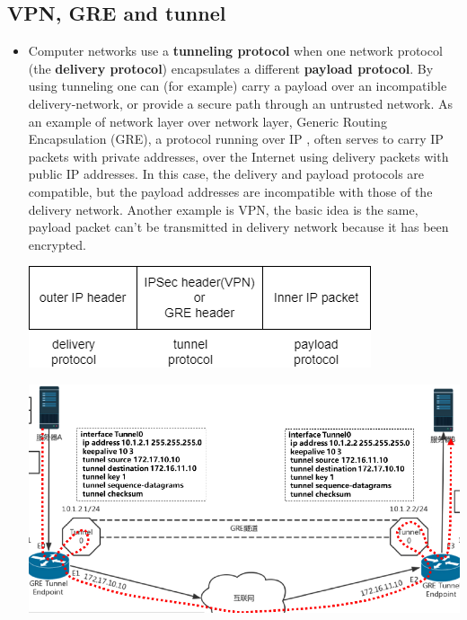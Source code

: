 \documentclass[a4paper,11pt,twoside]{book}
\begin{document}
\subsection{VPN, GRE and tunnel}
\begin{itemize}
	
	
	

	\item Computer networks use a \textbf{tunneling protocol} when one network protocol (the \textbf{delivery protocol}) encapsulates a different \textbf{payload protocol}. By using tunneling one can (for example) carry a payload over an incompatible delivery-network, or provide a secure path through an untrusted network. As an example of network layer over network layer, Generic Routing Encapsulation (GRE), a protocol running over IP , often serves to carry IP packets with private addresses, over the Internet using delivery packets with public IP addresses. In this case, the delivery and payload protocols are compatible, but the payload addresses are incompatible with those of the delivery network. Another example is VPN, the basic idea is the same, payload packet can't be transmitted in delivery network because it has been encrypted. 
	
	
	
	\begin{center}
		\includegraphics[width=0.48\linewidth]{pics/payload.drawio.png}
	\end{center}
	
	

	\begin{center}
		\includegraphics[width=0.80\linewidth]{pics/tunnel.png}
	\end{center}


\end{itemize}
\end{document}
